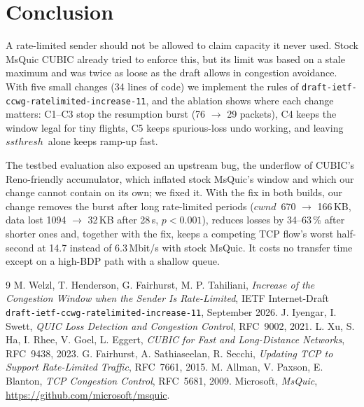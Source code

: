 \documentclass[11pt,a4paper]{article}
\newcommand{\cwnd}{\ensuremath{\mathit{cwnd}}}
\newcommand{\ssthresh}{\ensuremath{\mathit{ssthresh}}}
\begin{document}
\section{Conclusion}

A rate-limited sender should not be allowed to claim capacity it never used.
Stock MsQuic CUBIC already tried to enforce this, but its limit was based on
a stale maximum and was twice as loose as the draft allows in congestion
avoidance. With five small changes (34 lines of code) we implement the rules
of \texttt{draft-ietf-ccwg-ratelimited-increase-11}, and the ablation shows
where each change matters: C1--C3 stop the resumption burst (76 $\to$ 29
packets), C4 keeps the window legal for tiny flights, C5 keeps spurious-loss
undo working, and leaving \ssthresh\ alone keeps ramp-up fast.

The testbed evaluation also exposed an upstream bug, the underflow of CUBIC's
Reno-friendly accumulator, which inflated stock MsQuic's window and which our
change cannot contain on its own; we fixed it. With the fix in both builds,
our change removes the burst after long rate-limited periods (\cwnd\ 670
$\to$ 166\,KB, data lost 1094 $\to$ 32\,KB after 28\,s, $p < 0.001$), reduces
losses by 34--63\,\% after shorter ones and, together with the fix, keeps a
competing TCP flow's worst half-second at 14.7 instead of 6.3\,Mbit/s with
stock MsQuic. It costs no transfer time except on a high-BDP path with a
shallow queue.

\begin{thebibliography}{9}
 M. Welzl, T. Henderson, G. Fairhurst, M. P. Tahiliani,
  \emph{Increase of the Congestion Window when the Sender Is Rate-Limited},
  IETF Internet-Draft \texttt{draft-ietf-ccwg-ratelimited-increase-11},
  September 2026.
 J. Iyengar, I. Swett, \emph{QUIC Loss Detection and
  Congestion Control}, RFC~9002, 2021.
 L. Xu, S. Ha, I. Rhee, V. Goel, L. Eggert, \emph{CUBIC for
  Fast and Long-Distance Networks}, RFC~9438, 2023.
 G. Fairhurst, A. Sathiaseelan, R. Secchi, \emph{Updating TCP
  to Support Rate-Limited Traffic}, RFC~7661, 2015.
 M. Allman, V. Paxson, E. Blanton, \emph{TCP Congestion
  Control}, RFC~5681, 2009.
 Microsoft, \emph{MsQuic}, \url{https://github.com/microsoft/msquic}.
\end{thebibliography}
\end{document}
